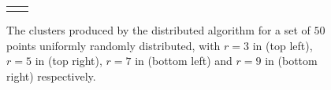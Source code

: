 \begin{figure}[htpb]
\begin{center}
\begin{tabular}{cc}
\vspace*{-6mm}
\end{tabular}
\end{center}
	\caption{\footnotesize The clusters produced by the distributed algorithm for a set of $50$ points uniformly randomly distributed, with $r=3$ in (top left), $r=5$ in (top right), $r=7$ in (bottom left) and $r=9$ in (bottom right) respectively. }
	\label{fig:snapshot}
\end{figure}

%
%
%
%
%
%










